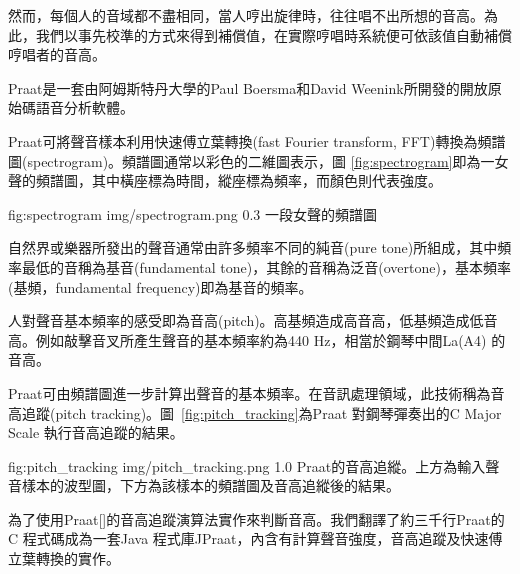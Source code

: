 \documentclass[12pt,a4paper,oneside]{report}
\begin{document}
然而，每個人的音域都不盡相同，當人哼出旋律時，往往唱不出所想的音高。為此，我們以事先校準的方式來得到補償值，在實際哼唱時系統便可依該值自動補償哼唱者的音高。


Praat是一套由阿姆斯特丹大學的Paul Boersma和David Weenink所開發的開放原始碼語音分析軟體。

Praat可將聲音樣本利用快速傅立葉轉換(fast Fourier transform, FFT)轉換為頻譜圖(spectrogram)。頻譜圖通常以彩色的二維圖表示，圖 \ref{fig:spectrogram}即為一女聲的頻譜圖，其中橫座標為時間，縱座標為頻率，而顏色則代表強度。

\figurewithcaption
{fig:spectrogram}
{img/spectrogram.png}
{0.3}
{一段女聲的頻譜圖}

自然界或樂器所發出的聲音通常由許多頻率不同的純音(pure tone)所組成，其中頻率最低的音稱為基音(fundamental tone)，其餘的音稱為泛音(overtone)，基本頻率(基頻，fundamental frequency)即為基音的頻率。

人對聲音基本頻率的感受即為音高(pitch)。高基頻造成高音高，低基頻造成低音高。例如敲擊音叉所產生聲音的基本頻率約為440 Hz，相當於鋼琴中間La(A4) 的音高。

Praat可由頻譜圖進一步計算出聲音的基本頻率。在音訊處理領域，此技術稱為音高追蹤(pitch tracking)。圖~\ref{fig:pitch_tracking}為Praat 對鋼琴彈奏出的C Major Scale 執行音高追蹤的結果。


\figurewithcaption
{fig:pitch_tracking}
{img/pitch_tracking.png}
{1.0}
{Praat的音高追縱。上方為輸入聲音樣本的波型圖，下方為該樣本的頻譜圖及音高追縱後的結果。}

為了使用Praat[]的音高追蹤演算法實作來判斷音高。我們翻譯了約三千行Praat的C 程式碼成為一套Java 程式庫JPraat，內含有計算聲音強度，音高追蹤及快速傅立葉轉換的實作。


\end{document}
